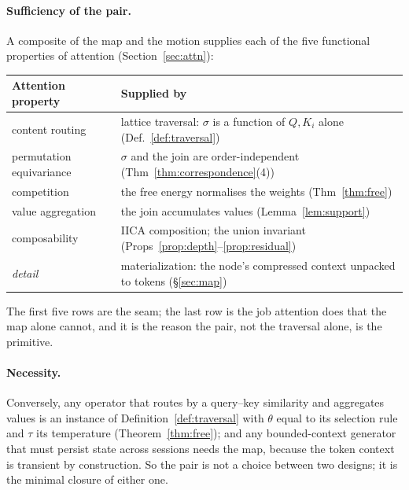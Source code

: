 \documentclass[11pt,a4paper]{article}
\theoremstyle{remark}
\newcommand{\sigm}{\ensuremath{\sigma}}                 %
\begin{document}
\paragraph{Sufficiency of the pair.} A composite of the map and the motion
supplies each of the five functional properties of attention
(Section~\ref{sec:attn}):
\begin{center}
\small
\begin{tabular}{@{}ll@{}}
\toprule
\textbf{Attention property} & \textbf{Supplied by} \\
\midrule
content routing & lattice traversal: $\sigm$ is a function of $Q,K_i$ alone (Def.~\ref{def:traversal}) \\
permutation equivariance & $\sigm$ and the join are order-independent (Thm~\ref{thm:correspondence}(4)) \\
competition & the free energy normalises the weights (Thm~\ref{thm:free}) \\
value aggregation & the join accumulates values (Lemma~\ref{lem:support}) \\
composability & IICA composition; the union invariant (Props~\ref{prop:depth}--\ref{prop:residual}) \\
\emph{detail} & materialization: the node's compressed context unpacked to tokens (\S\ref{sec:map}) \\
\bottomrule
\end{tabular}
\end{center}
The first five rows are the seam; the last row is the job attention does that
the map alone cannot, and it is the reason the pair, not the traversal alone, is
the primitive.

\paragraph{Necessity.} Conversely, any operator that routes by a query--key
similarity and aggregates values is an instance of Definition~\ref{def:traversal}
with $\theta$ equal to its selection rule and $\tau$ its temperature
(Theorem~\ref{thm:free}); and any bounded-context generator that must persist
state across sessions needs the map, because the token context is transient by
construction. So the pair is not a choice between two designs; it is the
minimal closure of either one.
\end{document}
